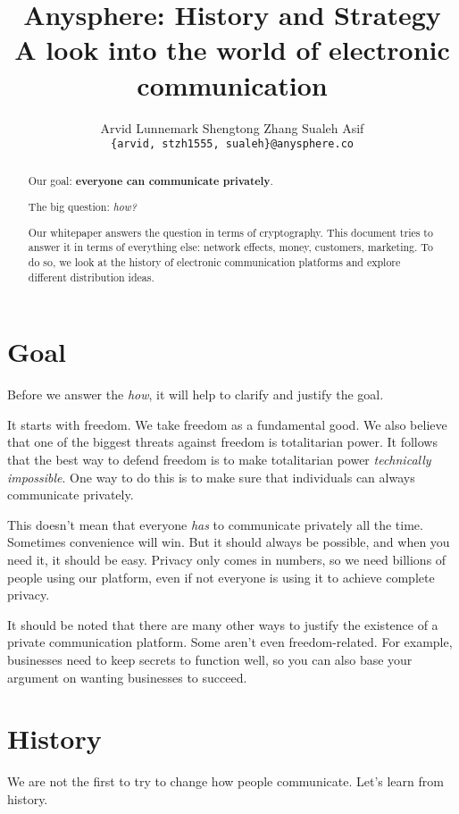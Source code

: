 \documentclass[sigconf, nonacm, balance=false, natbib=false]{acmart}
\title{\textbf{Anysphere: History and Strategy} \\ \vspace{0.4cm} {\huge \normalfont A look into the world of electronic communication}}
\date{\dateinfo}
\author{Arvid Lunnemark \hspace{0.7cm} Shengtong Zhang \hspace{0.7cm} Sualeh Asif \\ \vspace{0.1cm} \nolinkurl{{arvid, stzh1555, sualeh}@anysphere.co} \\ \vspace{0.4cm} \dateinfo}
\begin{document}
\pagecolor{pagecolor}

\begin{abstract}
    Our goal: \textbf{everyone can communicate privately}.

    The big question: \textit{how?}

    Our whitepaper answers the question in terms of cryptography. This document tries to answer it in terms of everything else: network effects, money, customers, marketing. To do so, we look at the history of electronic communication platforms and explore different distribution ideas.
\end{abstract}

\maketitle

\tableofcontents

\section{Goal}

Before we answer the \textit{how}, it will help to clarify and justify the goal.

It starts with freedom. We take freedom as a fundamental good. We also believe that one of the biggest threats against freedom is totalitarian power. It follows that the best way to defend freedom is to make totalitarian power \textit{technically impossible}. One way to do this is to make sure that individuals can always communicate privately.

This doesn't mean that everyone \textit{has} to communicate privately all the time. Sometimes convenience will win. But it should always be possible, and when you need it, it should be easy. Privacy only comes in numbers, so we need billions of people using our platform, even if not everyone is using it to achieve complete privacy.

It should be noted that there are many other ways to justify the existence of a private communication platform. Some aren't even freedom-related. For example, businesses need to keep secrets to function well, so you can also base your argument on wanting businesses to succeed.

\section{History}

We are not the first to try to change how people communicate. Let's learn from history.
\end{document}
